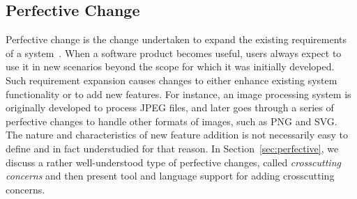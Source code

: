 \subsection{Perfective Change}

Perfective change is the change undertaken to expand the existing requirements of a system~\cite{Seaman2008:SMC}. When a software product becomes useful, users always expect to use it in new scenarios beyond the scope for which it was initially developed. Such requirement expansion causes changes to either enhance existing system functionality or to add new features. For instance, an image processing system is originally developed to process JPEG files, and later goes through a series of perfective changes to handle other formats of images, such as PNG and SVG. The nature and characteristics of new feature addition is not necessarily easy to define and in fact understudied for that reason. In Section~\ref{sec:perfective}, we discuss a rather well-understood type of perfective changes, called {\em crosscutting concerns} and then present tool and language support for adding crosscutting concerns. 


